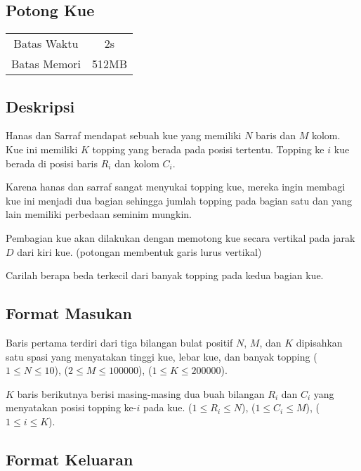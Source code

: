 \documentclass{article}
\begin{document}
\begin{center}
    \section*{Potong Kue} %

    \begin{tabular}{ | c c | }
        \hline
        Batas Waktu  & 2s \\    %
        Batas Memori & 512MB \\  %
        \hline
    \end{tabular}
\end{center}

\subsection*{Deskripsi}
Hanas dan Sarraf mendapat sebuah kue yang memiliki $N$ baris dan $M$ kolom. Kue ini memiliki $K$ topping yang berada pada posisi tertentu. Topping ke $i$ kue berada di posisi baris $R_i$ dan kolom $C_i$.

Karena hanas dan sarraf sangat menyukai topping kue, mereka ingin membagi
kue ini menjadi dua bagian sehingga jumlah topping pada bagian satu dan 
yang lain memiliki perbedaan seminim mungkin.

Pembagian kue akan dilakukan dengan memotong kue secara vertikal pada jarak $D$ dari kiri kue. (potongan membentuk garis lurus vertikal)

Carilah berapa beda terkecil dari banyak topping pada kedua bagian kue.

\subsection*{Format Masukan}

Baris pertama terdiri dari tiga bilangan bulat positif $N$, $M$, dan $K$ dipisahkan satu spasi yang menyatakan tinggi kue, lebar kue, dan banyak topping ($1 \leq N \leq 10$), ($2 \leq M \leq 100000$), ($1 \leq K \leq 200000$).

$K$ baris berikutnya berisi masing-masing dua buah bilangan $R_i$ dan $C_i$ yang menyatakan posisi topping ke-$i$ pada kue. ($1 \leq R_i \leq N$), ($1 \leq C_i \leq M$), ($1 \leq i \leq K$).

\subsection*{Format Keluaran}
\end{document}
